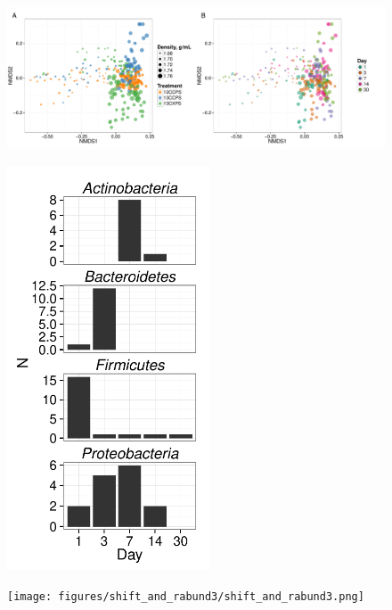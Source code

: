 \thispagestyle{empty}


\begin{figure}[H] \begin{center}
\centerline{\includegraphics[width=11.4cm]{figures/ordination_all1/ordination_all.pdf}}
\caption{\protect}\label{fig:ord}
\end{center} \end{figure}

\begin{figure}[H]
	\begin{center}
	\centerline{\includegraphics[width=6.0cm]{figures/xylose_rspndr_bar/xylose_rspndr_bar.pdf}}
	\caption{\protect}\label{fig:xyl_count}
        \end{center}
\end{figure}

\begin{figure}[H]
	\begin{center}
	\centerline{\texttt{[image: figures/shift\_and\_rabund3/shift\_and\_rabund3.png]}}
	\caption{\protect}\label{fig:shift}
    \end{center}
\end{figure}


\restoregeometry
